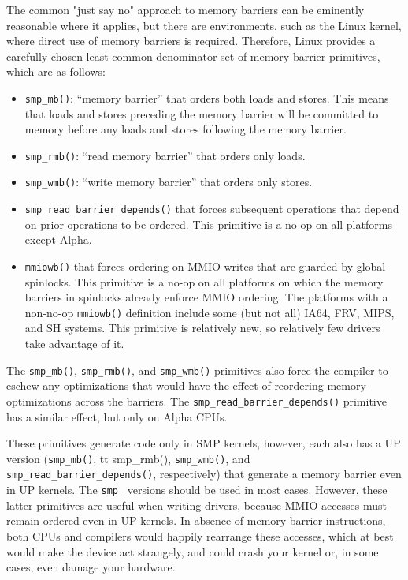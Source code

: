 The common "just say no" approach to memory barriers
can be eminently reasonable where it applies,
but there are environments, such as the Linux kernel, where direct
use of memory barriers is required.
Therefore,
Linux provides a carefully chosen least-common-denominator
set of memory-barrier primitives, which are as follows:
\begin{itemize}
\item	{\tt smp\_mb()}: ``memory barrier'' that orders both loads and
	stores.
	This means that loads and stores preceding the memory barrier
	will be committed to memory before any loads and stores
	following the memory barrier.
\item	{\tt smp\_rmb()}: ``read memory barrier'' that orders only loads.
\item	{\tt smp\_wmb()}: ``write memory barrier'' that orders only stores.
\item	{\tt smp\_read\_barrier\_depends()} that forces subsequent operations
	that depend on prior operations to be ordered.
	This primitive is a no-op on all platforms except Alpha.
\item	{\tt mmiowb()} that forces ordering on MMIO writes that are guarded
	by global spinlocks.
	This primitive is a no-op on all platforms on which the memory
	barriers in spinlocks already enforce MMIO ordering.
	The platforms with a non-no-op {\tt mmiowb()} definition include
	some (but not all) IA64, FRV, MIPS, and SH systems.
	This primitive is relatively new, so relatively few drivers take
	advantage of it.
\end{itemize}
The {\tt smp\_mb()}, {\tt smp\_rmb()}, and {\tt smp\_wmb()}
primitives also force
the compiler to eschew any optimizations that would have the effect
of reordering memory optimizations across the barriers.
The {\tt smp\_read\_barrier\_depends()} primitive has a similar effect, but
only on Alpha CPUs.

These primitives generate code only in SMP kernels, however, each
also has a UP version ({\tt smp\_mb()}, {tt smp\_rmb()}, {\tt smp\_wmb()},
and {\tt smp\_read\_barrier\_depends()},
respectively) that generate a memory barrier even in UP kernels. The {\tt smp\_}
versions should be used in most cases. However, these latter primitives
are useful when writing drivers, because MMIO accesses must remain
ordered even in UP kernels. In absence of memory-barrier instructions,
both CPUs and compilers would happily rearrange these accesses, which at
best would make the device act strangely, and could crash your kernel or,
in some cases, even damage your hardware.

